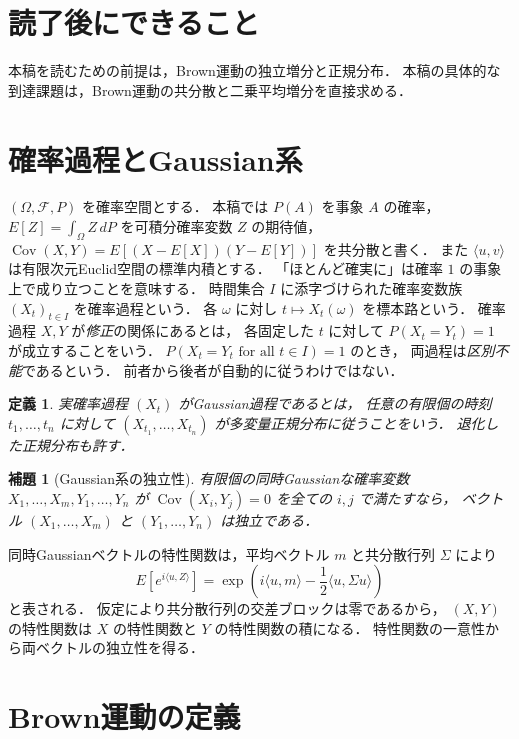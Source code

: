 \documentclass[a5paper,10pt,onecolumn]{jsarticle}
\makeatletter
\theoremstyle{mathnotetheorem}
\newtheorem{definition}[theorem]{定義}
\newtheorem{lemma}[theorem]{補題}
\renewcommand{\proofname}{証明}
\renewenvironment{proof}[1][\proofname]{%
  \par\pushQED{\qed}\normalfont\topsep4\p@\@plus2\p@\relax
  \trivlist\item[\hskip\labelsep\bfseries #1]\ignorespaces
}{\popQED\endtrivlist\@endpefalse}
\makeatother
\begin{document}
\section*{読了後にできること}
本稿を読むための前提は，Brown運動の独立増分と正規分布．
本稿の具体的な到達課題は，Brown運動の共分散と二乗平均増分を直接求める．

\section{確率過程とGaussian系}

$(\Omega,\mathcal F,P)$ を確率空間とする．
本稿では $P(A)$ を事象 $A$ の確率，
$E[Z]=\int_\Omega Z\,dP$ を可積分確率変数 $Z$ の期待値，
$\operatorname{Cov}(X,Y)=E[(X-E[X])(Y-E[Y])]$ を共分散と書く．
また $\langle u,v\rangle$ は有限次元Euclid空間の標準内積とする．
「ほとんど確実に」は確率 $1$ の事象上で成り立つことを意味する．
時間集合 $I$ に添字づけられた確率変数族
$(X_t)_{t\in I}$ を確率過程という．
各 $\omega$ に対し $t\mapsto X_t(\omega)$ を標本路という．
確率過程 $X,Y$ が\emph{修正}の関係にあるとは，
各固定した $t$ に対して $P(X_t=Y_t)=1$ が成立することをいう．
$P(X_t=Y_t\text{ for all }t\in I)=1$ のとき，
両過程は\emph{区別不能}であるという．
前者から後者が自動的に従うわけではない．

\begin{definition}
実確率過程 $(X_t)$ がGaussian過程であるとは，
任意の有限個の時刻 $t_1,\dots,t_n$ に対して
$(X_{t_1},\dots,X_{t_n})$ が多変量正規分布に従うことをいう．
退化した正規分布も許す．
\end{definition}

\begin{lemma}[Gaussian系の独立性]\label{lem:gauss-ind}
有限個の同時Gaussianな確率変数
$X_1,\dots,X_m,Y_1,\dots,Y_n$ が
$\operatorname{Cov}(X_i,Y_j)=0$ を全ての $i,j$ で満たすなら，
ベクトル $(X_1,\dots,X_m)$ と
$(Y_1,\dots,Y_n)$ は独立である．
\end{lemma}
\begin{proof}
同時Gaussianベクトルの特性関数は，平均ベクトル $m$
と共分散行列 $\Sigma$ により
\[
 E[e^{i\langle u,Z\rangle}]
 =\exp\!\left(i\langle u,m\rangle
 -\frac12\langle u,\Sigma u\rangle\right)
\]
と表される．
仮定により共分散行列の交差ブロックは零であるから，
$(X,Y)$ の特性関数は $X$ の特性関数と $Y$ の特性関数の積になる．
特性関数の一意性から両ベクトルの独立性を得る．
\end{proof}

\section{Brown運動の定義}
\end{document}
